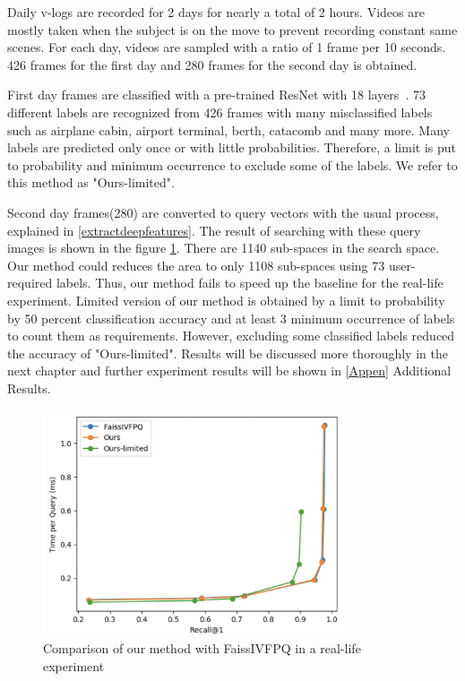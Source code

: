 Daily v-logs are recorded for 2 days for nearly a total of 2 hours. 
Videos are mostly taken when the subject is on the move to prevent recording constant same scenes.
For each day, videos are sampled with a ratio of 1 frame per 10 seconds. 
426 frames for the first day and 280 frames for the second day is obtained.

First day frames are classified with a pre-trained ResNet with 18 layers~\cite{resnet}. 
73 different labels are recognized from 426 frames with many misclassified labels such as airplane cabin, airport terminal, berth, catacomb and many more. 
Many labels are predicted only once or with little probabilities. Therefore, a limit is put to probability and minimum occurrence to exclude some of the labels. 
We refer to this method as "Ours-limited".

Second day frames(280) are converted to query vectors with the usual process, explained in \ref{extractdeepfeatures}. The result of searching with these query images is shown in the figure \ref{fig:realdataexp}. 
There are 1140 sub-spaces in the search space. Our method could reduces the area to only 1108 sub-spaces using 73 user-required labels. 
Thus, our method fails to speed up the baseline for the real-life experiment. 
Limited version of our method is obtained by a limit to probability by 50 percent classification accuracy and at least 3 minimum occurrence of labels to count them as requirements.
However, excluding some classified labels reduced the accuracy of "Ours-limited".
Results will be discussed more thoroughly in the next chapter and further experiment results will be shown in \ref{Appen} Additional Results.

\begin{figure}
    \centering
    \includegraphics[width=0.8\textwidth]{thesis/images/real_data_experiment.png}
    \caption{Comparison of our method with FaissIVFPQ in a real-life experiment}
    \label{fig:realdataexp}
\end{figure}

